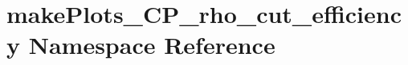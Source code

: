 \hypertarget{namespacemakePlots__CP__rho__cut__efficiency}{
\section{makePlots\_\-CP\_\-rho\_\-cut\_\-efficiency Namespace Reference}
\label{namespacemakePlots__CP__rho__cut__efficiency}
}
